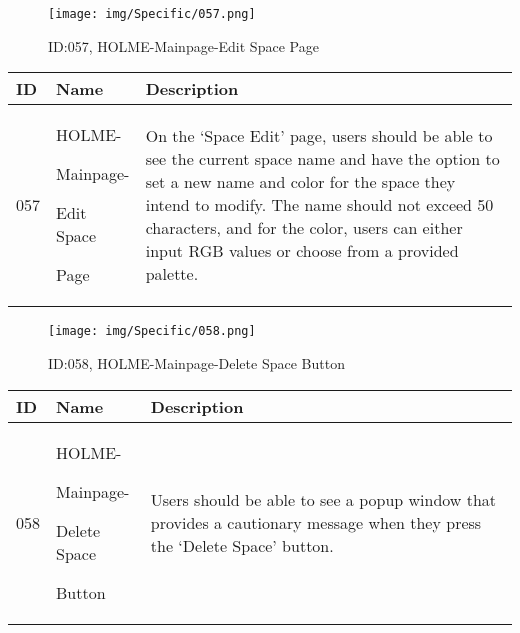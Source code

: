 \documentclass[conference]{IEEEtran}
\begin{document}
\begin{enumerate}
\begin{figure}[h]
\centering
\texttt{[image: img/Specific/057.png]}
\caption{ID:057, HOLME-Mainpage-Edit Space Page}
\end{figure}
\begin{table}[h]
\def\arraystretch{1.2} \small
    \begin{tabular}{|p{1cm}|p{1.8cm}|p{5.0cm}|}
        \hline
        ID & Name & Description\\ \hline
         057 \par  & HOLME-\par Mainpage-\par Edit Space\par Page  &On the `Space Edit' page, users should be able to see the current space name and have the option to set a new name and color for the space they intend to modify. The name should not exceed 50 characters, and for the color, users can either input RGB values or choose from a provided palette.\\ \hline
    \end{tabular}
\end{table}

\clearpage

\begin{figure}[h]
\centering
\texttt{[image: img/Specific/058.png]}
\caption{ID:058, HOLME-Mainpage-Delete Space Button}
\end{figure}
\begin{table}[h]
\def\arraystretch{1.2} \small
    \begin{tabular}{|p{1cm}|p{1.8cm}|p{5.0cm}|}
        \hline
        ID & Name & Description\\ \hline
         058 \par  & HOLME-\par Mainpage-\par Delete Space\par Button &Users should be able to see a popup window that provides a cautionary message when they press the `Delete Space' button.\\ \hline
    \end{tabular}
\end{table}


\end{enumerate}
\end{document}
